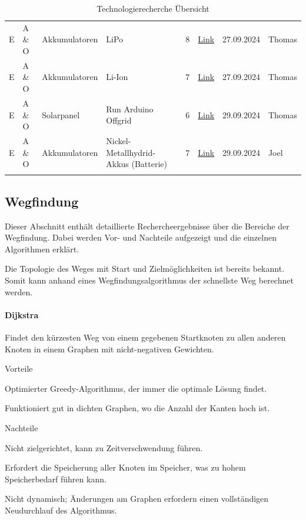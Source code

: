 \documentclass[../main.tex]{subfiles}
\begin{document}
\begin{longtable}{lp{2cm}p{2cm}p{4cm}clcl}
\tabularnewline
E & A \& O & Akkumulatoren & LiPo & 8 & \href{https://www.lion-care.com/lipo-akkus-eigenschaften-vorteile-und-mehr}{Link} & 27.09.2024 & Thomas
\tabularnewline
E & A \& O & Akkumulatoren & Li-Ion & 7 & \href{https://poleenergy.ch/shop_content.php?coID=32}{Link} & 27.09.2024 & Thomas
\tabularnewline
E & A \& O & Solarpanel & Run Arduino Offgrid & 6 & \href{https://voltaicsystems.com/solar-arduino-guide/}{Link} & 29.09.2024 & Thomas
\tabularnewline
E & A \& O & Akkumulatoren & Nickel-Metallhydrid-Akkus \newline (Batterie) & 7 & \href{https://www.chemie.de/lexikon/Nickel-Metallhydrid-Akkumulator.html}{Link} & 29.09.2024 & Joel
\tabularnewline
\caption{Technologierecherche Übersicht}
\label{tab:technologierecherche}
\end{longtable}
\normalsize




\newpage
\subsection{Wegfindung}

Dieser Abschnitt enthält detaillierte Rechercheergebnisse über die Bereiche der Wegfindung. Dabei werden Vor- und Nachteile aufgezeigt und die einzelnen Algorithmen erklärt.

Die Topologie des Weges mit Start und Zielmöglichkeiten ist bereits bekannt.
Somit kann anhand eines Wegfindungsalgorithmus der schnellste Weg berechnet werden.

\paragraph{Dijkstra}

Findet den kürzesten Weg von einem gegebenen Startknoten zu allen anderen Knoten in einem Graphen mit nicht-negativen Gewichten.

\begin{minipage}[t]{0.48\textwidth}
\begin{items}
  \item [Vorteile]
  \item Optimierter Greedy-Algorithmus, der immer die optimale Lösung findet.
  \item Funktioniert gut in dichten Graphen, wo die Anzahl der Kanten hoch ist.
\end{items}
\end{minipage}
\hfill
\begin{minipage}[t]{0.48\textwidth}
\begin{items}
  \item [Nachteile]
  \item Nicht zielgerichtet, kann zu Zeitverschwendung führen.
  \item Erfordert die Speicherung aller Knoten im Speicher, was zu hohem Speicherbedarf führen kann.
  \item Nicht dynamisch; Änderungen am Graphen erfordern einen vollständigen Neudurchlauf des Algorithmus.
\end{items}
\end{minipage}
\end{document}
